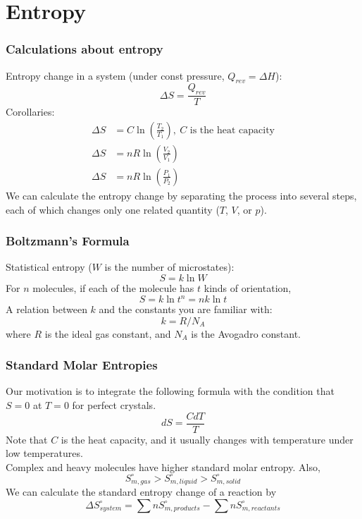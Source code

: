 \documentclass[aspectratio=169]{beamer}
\def\blankline{\\[6pt]}
\begin{document}
\section{Entropy}
  \begin{frame}
    \frametitle{Calculations about entropy}
    Entropy change in a system (under const pressure, $Q_{rev} = \Delta H$):
    \begin{equation*}
      \Delta S = \frac{Q_{rev}}{T}
    \end{equation*}
    Corollaries:
    \begin{align*}
      \Delta S &= C\ln\left(\frac{T_2}{T_1}\right), \ \text{$C$ is the heat capacity} \\
      \Delta S &= nR\ln\left(\frac{V_2}{V_1}\right) \\
      \Delta S &= nR\ln\left(\frac{P_1}{P_2}\right)
    \end{align*}
    We can calculate the entropy change by separating the process into several steps, each of which changes only one 
    related quantity ($T$, $V$, or $p$).
  \end{frame}
  \begin{frame}
    \frametitle{Boltzmann's Formula}
    Statistical entropy ($W$ is the number of microstates):
    \begin{equation*}
      S = k \ln W
    \end{equation*}
    For $n$ molecules, if each of the molecule has $t$ kinds of orientation, 
    \begin{equation*}
      S = k \ln t^n = nk \ln t
    \end{equation*}
    A relation between $k$ and the constants you are familiar with:
    \begin{equation*}
      k = R/N_A
    \end{equation*}
    where $R$ is the ideal gas constant, and $N_A$ is the Avogadro constant.
  \end{frame}
  \begin{frame}
    \frametitle{Standard Molar Entropies}
    Our motivation is to integrate the following formula with the condition that $S=0$ at $T=0$ for perfect crystals.
    \begin{equation*}
      dS = \frac{CdT}{T}
    \end{equation*}
    Note that $C$ is the heat capacity, and it usually changes with temperature under low temperatures.
    \blankline
    Complex and heavy molecules have higher standard molar entropy. Also, 
    \begin{equation*}
      S_{m, gas}^{\circ} > S_{m, liquid}^{\circ} > S_{m, solid}^{\circ}
    \end{equation*}
    We can calculate the standard entropy change of a reaction by
    \begin{equation*}
      \Delta S_{system}^{\circ} = \sum n S_{m, products}^{\circ} - \sum n S_{m, reactants}^{\circ}
    \end{equation*}
  \end{frame}
\end{document}
